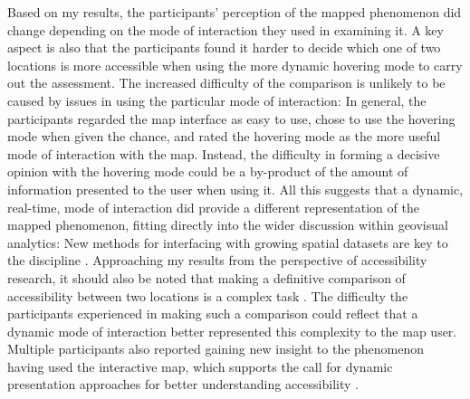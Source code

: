 Based on my results, the participants' perception of the mapped phenomenon did change
depending on the mode of interaction they used in examining it.
A key aspect is also that the participants found it harder to decide which one
of two locations is more accessible
when using the more dynamic hovering mode to carry out the assessment.
The increased difficulty of the
comparison is unlikely to be caused by
issues in using the particular mode of interaction:
In general, the participants regarded the map interface as easy to use,
chose to use the hovering mode when given the chance,
and rated the hovering mode as the more useful mode
of interaction with the map.
Instead, the difficulty in forming a decisive opinion with the hovering mode
could be a by-product of the amount of information presented to the user when using it.
All this suggests that a dynamic, real-time, mode of interaction did provide
a different representation of the mapped phenomenon,
fitting directly into the wider discussion within geovisual analytics:
New methods for interfacing with growing spatial datasets are key to the discipline
\parencite{rob2017b, and2010}.
Approaching my results from the perspective of accessibility research,
it should also be noted that making a definitive comparison of accessibility between
two locations is a complex task \parencite{geu2004, lev2020, hu2019}.
The difficulty the participants experienced in making such a comparison
could reflect that a dynamic mode of interaction
better represented this complexity to the map user.
Multiple participants also reported gaining new insight to the phenomenon
having used the interactive map,
which supports the call for dynamic presentation approaches
for better understanding accessibility \parencite{but2018, te2014}.



